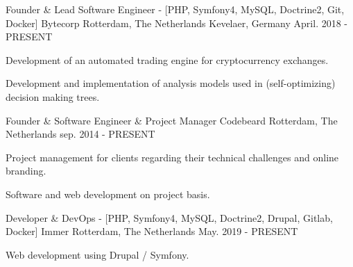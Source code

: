 

\begin{cventries}

  \cventry
    {Founder \& Lead Software Engineer - [PHP, Symfony4, MySQL, Doctrine2, Git, Docker]} %
    {Bytecorp} %
    {Rotterdam, The Netherlands Kevelaer, Germany} %
    {April. 2018 - PRESENT} %
    {
      \begin{cvitems} %
        \item {Development of an automated trading engine for cryptocurrency exchanges.}
        \item {Development and implementation of analysis models used in (self-optimizing) decision making trees.}
      \end{cvitems}
    }
    
  \cventry
    {Founder \& Software Engineer \& Project Manager} %
    {Codebeard} %
    {Rotterdam, The Netherlands} %
    {sep. 2014 - PRESENT} %
    {
      \begin{cvitems} %
        \item {Project management for clients regarding their technical challenges and online branding.}
        \item {Software and web development on project basis.}
      \end{cvitems}
    }
    
  \cventry
    {Developer \& DevOps - [PHP, Symfony4, MySQL, Doctrine2, Drupal, Gitlab, Docker]} %
    {Immer} %
    {Rotterdam, The Netherlands} %
    {May. 2019 - PRESENT} %
    {
      \begin{cvitems} %
        \item {Web development using Drupal / Symfony.}
      \end{cvitems}
    }


\end{cventries}
